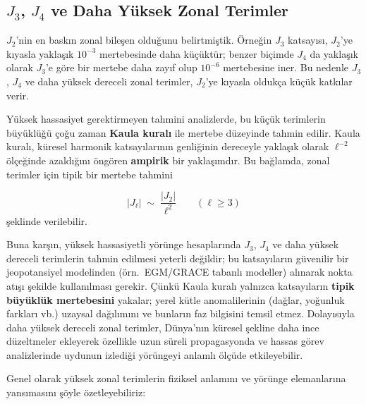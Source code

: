 \subsection{$J_3$, $J_4$ ve Daha Yüksek Zonal Terimler}
\label{subsec:J3_J4}

$J_2$'nin en baskın zonal bileşen olduğunu belirtmiştik. Örneğin
$J_3$ katsayısı, $J_2$'ye kıyasla yaklaşık $10^{-3}$ mertebesinde daha küçüktür; benzer biçimde $J_4$ da yaklaşık olarak $J_3$'e göre bir mertebe daha zayıf olup $10^{-6}$ mertebesine iner. Bu nedenle $J_3$, $J_4$ ve daha yüksek dereceli zonal terimler,
$J_2$'ye kıyasla oldukça küçük katkılar verir.

Yüksek hassasiyet gerektirmeyen tahmini analizlerde, bu küçük terimlerin büyüklüğü çoğu zaman \textbf{Kaula kuralı} ile mertebe düzeyinde tahmin edilir. Kaula kuralı, küresel harmonik katsayılarının genliğinin dereceyle yaklaşık olarak $\ell^{-2}$ ölçeğinde azaldığını öngören \textbf{ampirik} bir yaklaşımdır. Bu bağlamda, zonal terimler için tipik bir mertebe tahmini

\begin{equation}
|J_\ell| \;\sim\; \frac{|J_2|}{\ell^2}
\qquad (\ell\ge 3)
\label{eq:kaula_zonal}
\end{equation}
şeklinde verilebilir.

Buna karşın, yüksek hassasiyetli yörünge hesaplarında $J_3$, $J_4$ ve daha yüksek dereceli terimlerin tahmin edilmesi yeterli değildir; bu katsayıların güvenilir bir jeopotansiyel modelinden (örn.\ EGM/GRACE tabanlı modeller) alınarak nokta atışı şekilde
kullanılması gerekir. Çünkü Kaula kuralı yalnızca katsayıların \textbf{tipik büyüklük mertebesini} yakalar; yerel kütle anomalilerinin (dağlar, yoğunluk farkları vb.) uzaysal dağılımını ve bunların faz bilgisini temsil etmez. Dolayısıyla daha yüksek dereceli zonal terimler, Dünya'nın küresel şekline daha ince düzeltmeler ekleyerek özellikle uzun süreli propagasyonda
ve hassas görev analizlerinde uydunun izlediği yörüngeyi anlamlı ölçüde etkileyebilir. 

Genel olarak yüksek zonal terimlerin fiziksel anlamını ve yörünge elemanlarına yansımasını şöyle özetleyebiliriz:


